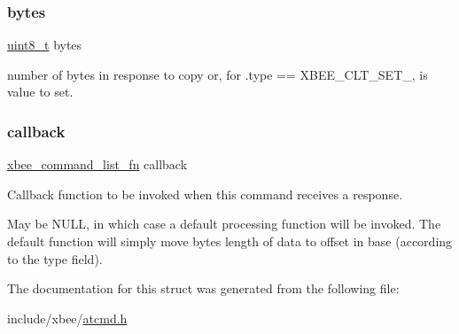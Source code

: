 \subsubsection{\texorpdfstring{bytes}{bytes}}
{\footnotesize\ttfamily \hyperlink{group__hal__dos_gae1affc9ca37cfb624959c866a73f83c2}{uint8\+\_\+t} bytes}



number of bytes in response to copy or, for .type == X\+B\+E\+E\+\_\+\+C\+L\+T\+\_\+\+S\+E\+T\+\_, is value to set. 

\mbox{\label{structxbee__atcmd__reg__t_a2611714f3f3d031a2c5f8202f2544567}} 
\subsubsection{\texorpdfstring{callback}{callback}}
{\footnotesize\ttfamily \hyperlink{group__xbee__atcmd_ga7909235eb77ba64c93742f8f9013d7fb}{xbee\+\_\+command\+\_\+list\+\_\+fn} callback}



Callback function to be invoked when this command receives a response. 

May be N\+U\+LL, in which case a default processing function will be invoked. The default function will simply move {\ttfamily bytes} length of data to {\ttfamily offset} in {\ttfamily base} (according to the {\ttfamily type} field). 

The documentation for this struct was generated from the following file\+:\begin{DoxyCompactItemize}
\item 
include/xbee/\hyperlink{atcmd_8h}{atcmd.\+h}\end{DoxyCompactItemize}
